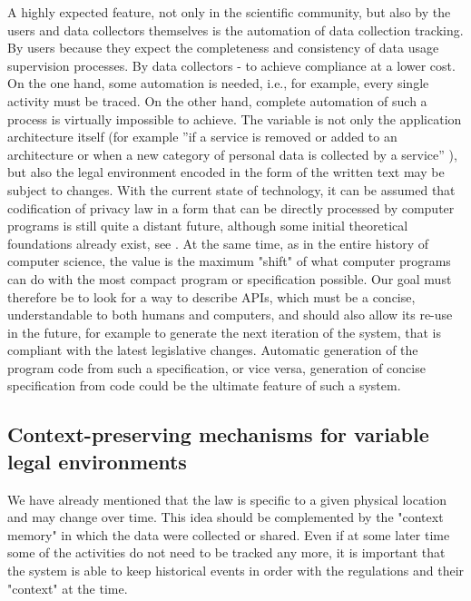 A highly expected feature, not only in the scientific community, but also by the users and data collectors themselves is the automation of data collection tracking. By users because they expect the completeness and consistency of data usage supervision processes. By data collectors - to achieve compliance at a lower cost. On the one hand, some automation is needed, i.e., for example, every single activity must be traced. On the other hand, complete automation of such a process is virtually impossible to achieve. The variable is not only the application architecture itself (for example ''if a service is removed or added to an architecture or when a new category of personal data is collected by a service'' \cite{ErnstTransparencyComputing}), but also the legal environment encoded in the form of the written text may be subject to changes. With the current state of technology, it can be assumed that codification of privacy law in a form that can be directly processed by computer programs is still quite a distant future, although some initial theoretical foundations already exist, see \cite{Spiekermann2006TechnologyComputing}. At the same time, as in the entire history of computer science, the value is the maximum "shift" of what computer programs can do with the most compact program or specification possible. Our goal must therefore be to look for a way to describe APIs, which must be a concise, understandable to both humans and computers, and should also allow its re-use in the future, for example to generate the next iteration of the system, that is compliant with the latest legislative changes. Automatic generation of the program code from such a specification, or vice versa, generation of concise specification from code could be the ultimate feature of such a system.

\subsection{Context-preserving mechanisms for variable legal environments}
We have already mentioned that the law is specific to a given physical location and may change over time. This idea should be complemented by the "context memory" in which the data were collected or shared. Even if at some later time some of the activities do not need to be tracked any more, it is important that the system is able to keep historical events in order with the regulations and their "context" at the time.


